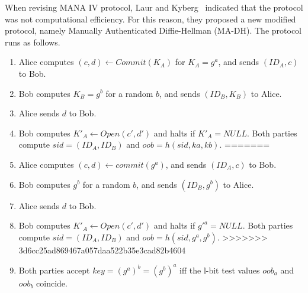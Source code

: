When revising MANA IV protocol, Laur and Kyberg~\cite{Laur:2006kl} indicated that the protocol was not computational efficiency. For this reason, they proposed a new modified protocol, namely Manually Authenticated Diffie-Hellman (MA-DH). The protocol runs as follows. 
 
\begin{enumerate}
<<<<<<< HEAD
\item Alice computes $(c,d) \leftarrow Commit(K_A)$ for $K_A = g^a$, and sends $(ID_A, c)$ to Bob.
\item Bob computes $K_B = g^b$ for a random $b$, and sends $ (ID_B,K_B)$ to Alice.
\item Alice sends $d$ to Bob. 
\item Bob computes $K'_A \leftarrow Open(c',d')$ and halts if $K'_A = NULL$. Both parties compute $sid = (ID_A,ID_B)$ and $oob= h(sid,ka,kb)$.
=======
\item Alice computes $(c,d) \leftarrow commit(g^a)$, and sends $(ID_A, c)$ to Bob.
\item Bob computes $g^b$ for a random $b$, and sends $ (ID_B,g^b)$ to Alice.
\item Alice sends $d$ to Bob. 
\item Bob computes $K'_A \leftarrow Open(c',d')$ and halts if $g'^a = NULL$. Both parties compute $sid = (ID_A,ID_B)$ and $oob= h(sid,g^a,g^b)$.
>>>>>>> 3d6cc25ad869467a057daa522b35e3cad82b4604
\item Both parties accept $key = (g^a)^b = (g^b)^a$ iff the l-bit test values $oob_a$ and $oob_b$ coincide. 
\end{enumerate}

